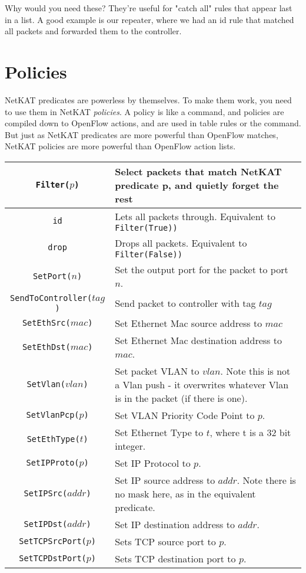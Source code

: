 Why would you need these?  
They're useful for "catch all" rules that appear last in a list.
A good example is our repeater, where we had an id rule that matched all packets and
forwarded them to the controller.

\section{Policies}

NetKAT predicates are powerless by themselves.  
To make them work, you need to use them in NetKAT \textit{policies}.
A policy is like a command, and policies are compiled down to OpenFlow actions, 
and are used in table rules or the  command.  
But just as NetKAT predicates are more powerful than OpenFlow matches, NetKAT policies are more
powerful than OpenFlow action lists.

\bigskip
\begin{tabularx}{\linewidth}{|c|X|}
\hline\hline
\texttt{Filter($p$)} & Select packets that match NetKAT predicate p, and quietly forget the rest  
\\ \hline
\texttt{id} & Lets all packets through.  Equivalent to \texttt{Filter(True))}  
\\ \hline
\texttt{drop} & Drops all packets.  Equivalent to \texttt{Filter(False))}  
\\ \hline
\texttt{SetPort($n$)} & Set the output port for the packet to port $n$.    
\\ \hline
\texttt{SendToController($tag$)} & Send packet to controller with tag $tag$    
\\ \hline
\texttt{SetEthSrc($mac$)} & Set Ethernet Mac source address to $mac$
\\ \hline
\texttt{SetEthDst($mac$)} & Set Ethernet Mac destination address to $mac$.
\\ \hline
\texttt{SetVlan($vlan$)} & Set packet VLAN to $vlan$.  Note this is not a Vlan push - it overwrites whatever 
Vlan is in the packet (if there is one).  
\\ \hline
\texttt{SetVlanPcp($p$)} & Set VLAN Priority Code Point to $p$.
\\ \hline
\texttt{SetEthType($t$)} & Set Ethernet Type to $t$, where t is a 32 bit integer.
\\ \hline
\texttt{SetIPProto($p$)} & Set IP Protocol to $p$.    
\\ \hline
\texttt{SetIPSrc($addr$)} & Set IP source address to $addr$.  Note there is no mask here, as in the equivalent predicate.  
\\ \hline
\texttt{SetIPDst($addr$)} & Set IP destination address to $addr$.  
\\ \hline
\texttt{SetTCPSrcPort($p$)} & Sets TCP source port to $p$.
\\ \hline
\texttt{SetTCPDstPort($p$)} & Sets TCP destination port to $p$.  
\\ \hline\hline
\end{tabularx}
\bigskip

